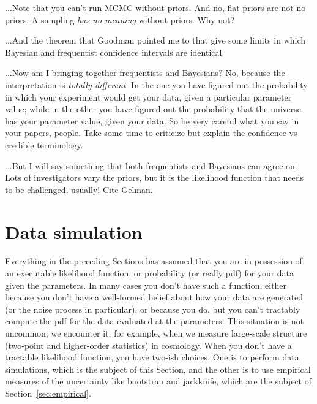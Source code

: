 \documentclass[10pt]{article}
\newcommand{\sectionname}{Section}
\begin{document}
...Note that you can't run MCMC without priors. And no, flat priors are not no
priors. A sampling \emph{has no meaning} without priors. Why not?

...And the theorem that Goodman pointed me to that give some limits in which
Bayesian and frequentist confidence intervals are identical.

...Now am I bringing together frequentists and Bayesians? No, because the
interpretation is \emph{totally different}. In the one you have figured out the
probability in which your experiment would get your data, given a particular
parameter value; while in the other you have figured out the probability that
the universe has your parameter value, given your data. So be very careful
what you say in your papers, people. Take some time to criticize but explain the
confidence vs credible terminology.

...But I will say something that both frequentists and Bayesians can agree on:
Lots of investigators vary the priors, but it is the likelihood function
that needs to be challenged, usually! Cite Gelman.

\section{Data simulation}\label{sec:simulation}

Everything in the preceding \sectionname s has assumed that you are in possession
of an executable likelihood function, or probability (or really pdf)
for your data given the parameters.
In many cases you don't have such a function, either because you don't have
a well-formed belief about how your data are generated (or the noise process
in particular), or because you do, but you can't tractably compute the
pdf for the data evaluated at the parameters.
This situation is not uncommon; we encounter it, for example,
when we measure large-scale structure (two-point and higher-order statistics)
in cosmology.
When you don't have a tractable likelihood function, you have two-ish choices.
One is to perform data simulations, which is the subject of this \sectionname,
and the other is to use empirical measures of the uncertainty like bootstrap and
jackknife, which are the subject of \sectionname~\ref{sec:empirical}.
\end{document}
